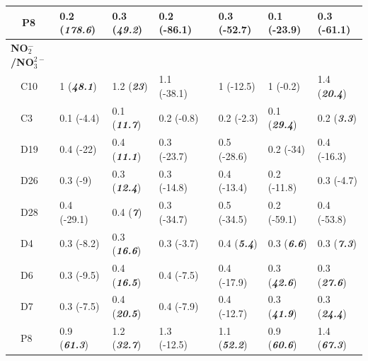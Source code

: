 \documentclass[letterpaper,12pt,oneside]{article}\usepackage[]{graphicx}\usepackage[]{color}
\begin{document}
\begin{table}[!tbp]
\begin{center}
\begin{tabular}{llllclll}
~~P8&0.2 \footnotesize{(\textit{\textbf{178.6}})}&0.3 \footnotesize{(\textit{\textbf{49.2}})}&0.2 \footnotesize{(-86.1)}&&0.3 \footnotesize{(-52.7)}&0.1 \footnotesize{(-23.9)}&0.3 \footnotesize{(-61.1)}\tabularnewline
\hline
{\bfseries NO$_{2}^{-}$/NO$_{3}^{2-}$}&&&&&&&\tabularnewline
~~C10&1 \footnotesize{(\textit{\textbf{48.1}})}&1.2 \footnotesize{(\textit{\textbf{23}})}&1.1 \footnotesize{(-38.1)}&&1 \footnotesize{(-12.5)}&1 \footnotesize{(-0.2)}&1.4 \footnotesize{(\textit{\textbf{20.4}})}\tabularnewline
~~C3&0.1 \footnotesize{(-4.4)}&0.1 \footnotesize{(\textit{\textbf{11.7}})}&0.2 \footnotesize{(-0.8)}&&0.2 \footnotesize{(-2.3)}&0.1 \footnotesize{(\textit{\textbf{29.4}})}&0.2 \footnotesize{(\textit{\textbf{3.3}})}\tabularnewline
~~D19&0.4 \footnotesize{(-22)}&0.4 \footnotesize{(\textit{\textbf{11.1}})}&0.3 \footnotesize{(-23.7)}&&0.5 \footnotesize{(-28.6)}&0.2 \footnotesize{(-34)}&0.4 \footnotesize{(-16.3)}\tabularnewline
~~D26&0.3 \footnotesize{(-9)}&0.3 \footnotesize{(\textit{\textbf{12.4}})}&0.3 \footnotesize{(-14.8)}&&0.4 \footnotesize{(-13.4)}&0.2 \footnotesize{(-11.8)}&0.3 \footnotesize{(-4.7)}\tabularnewline
~~D28&0.4 \footnotesize{(-29.1)}&0.4 \footnotesize{(\textit{\textbf{7}})}&0.3 \footnotesize{(-34.7)}&&0.5 \footnotesize{(-34.5)}&0.2 \footnotesize{(-59.1)}&0.4 \footnotesize{(-53.8)}\tabularnewline
~~D4&0.3 \footnotesize{(-8.2)}&0.3 \footnotesize{(\textit{\textbf{16.6}})}&0.3 \footnotesize{(-3.7)}&&0.4 \footnotesize{(\textit{\textbf{5.4}})}&0.3 \footnotesize{(\textit{\textbf{6.6}})}&0.3 \footnotesize{(\textit{\textbf{7.3}})}\tabularnewline
~~D6&0.3 \footnotesize{(-9.5)}&0.4 \footnotesize{(\textit{\textbf{16.5}})}&0.4 \footnotesize{(-7.5)}&&0.4 \footnotesize{(-17.9)}&0.3 \footnotesize{(\textit{\textbf{42.6}})}&0.3 \footnotesize{(\textit{\textbf{27.6}})}\tabularnewline
~~D7&0.3 \footnotesize{(-7.5)}&0.4 \footnotesize{(\textit{\textbf{20.5}})}&0.4 \footnotesize{(-7.9)}&&0.4 \footnotesize{(-12.7)}&0.3 \footnotesize{(\textit{\textbf{41.9}})}&0.3 \footnotesize{(\textit{\textbf{24.4}})}\tabularnewline
~~P8&0.9 \footnotesize{(\textit{\textbf{61.3}})}&1.2 \footnotesize{(\textit{\textbf{32.7}})}&1.3 \footnotesize{(-12.5)}&&1.1 \footnotesize{(\textit{\textbf{52.2}})}&0.9 \footnotesize{(\textit{\textbf{60.6}})}&1.4 \footnotesize{(\textit{\textbf{67.3}})}\tabularnewline
\hline
\end{tabular}\end{center}

\end{table}
\end{document}
